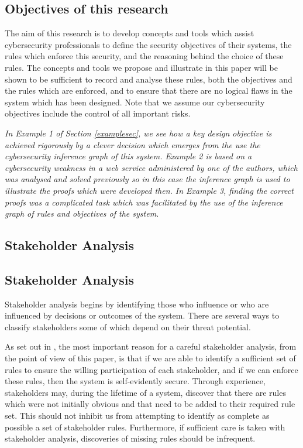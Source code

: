 \subsection{Objectives of this research}

The aim of this research is to develop concepts and tools which assist
cybersecurity professionals to define the security objectives of their
systems, the rules which enforce this security, and the reasoning
behind the choice of these rules. The concepts and tools we propose
and illustrate in this paper will be shown to be sufficient to record
and analyse these rules, both the objectives and the rules which are
enforced, and to ensure that there are no logical flaws in the system
which has been designed. Note that we assume our cybersecurity objectives include
the control of all important risks. 

{\em In Example 1 of Section \ref{examplesec},
we see how a key design objective is achieved rigorously by a clever decision
which emerges from the use the cybersecurity inference graph of this system.
Example 2 is based on a cybersecurity weakness in a web service administered 
by one of the authors, which was analysed and solved previously \cite{exptsandproofs}
so in this case the inference graph is used to illustrate the proofs which were developed then.
In Example 3, finding the correct proofs was a complicated task which was
facilitated by the use of the inference graph of rules and objectives of the system.}



\subsection{Stakeholder Analysis}

\subsection{Stakeholder Analysis}
Stakeholder analysis \cite{exptsandproofs,project2018guide,rose2013guide} begins by identifying those who influence or who are influenced by decisions or outcomes of the system. There are several ways to classify stakeholders  some of which depend on their threat potential. 

As set out in \cite{exptsandproofs}, the most important reason for a careful stakeholder analysis, from the point of view of this paper, is that if we are able to identify a sufficient set of rules to ensure the willing participation of each stakeholder, and if we can enforce these rules, then the system is self-evidently secure.  Through experience, stakeholders may, during the lifetime of a system, discover that there are rules which were not initially obvious and that need to be added to their required rule set. This should not inhibit us from attempting to identify as complete as possible a set of stakeholder rules. Furthermore, if sufficient care is taken with stakeholder analysis, discoveries of missing rules should be infrequent.

